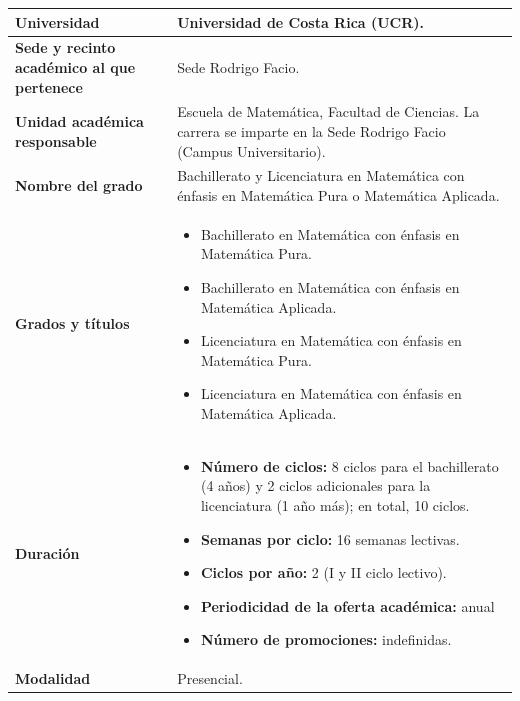 \documentclass[11pt,a4paper]{article}
\begin{document}
\begingroup
\renewcommand{\arraystretch}{1.35}
\begin{longtable}{|>{\columncolor{Celeste-UCR!15}\raggedright\arraybackslash\bfseries}p{4.3cm}|>{\raggedright\arraybackslash}p{12.5cm}|}
\hline
Universidad & Universidad de Costa Rica (UCR). \\ \hline
Sede y recinto académico al que pertenece & Sede Rodrigo Facio. \\ \hline
Unidad académica responsable & Escuela de Matemática, Facultad de Ciencias. La carrera se imparte en la Sede Rodrigo Facio (Campus Universitario). \\ \hline
Nombre del grado & Bachillerato y Licenciatura en Matemática con énfasis en Matemática Pura o Matemática Aplicada. \\ \hline
Grados y títulos &
\begin{minipage}[t]{12.2cm}
\begin{itemize}[leftmargin=1.2em, itemsep=1pt, topsep=2pt, parsep=0pt]
  \item Bachillerato en Matemática con énfasis en Matemática Pura.
  \item Bachillerato en Matemática con énfasis en Matemática Aplicada.
  \item Licenciatura en Matemática con énfasis en Matemática Pura.
  \item Licenciatura en Matemática con énfasis en Matemática Aplicada.
\end{itemize}
\end{minipage} \\ \hline
Duración &
\begin{minipage}[t]{12.2cm}
\begin{itemize}[leftmargin=1.2em, itemsep=1pt, topsep=2pt, parsep=0pt]
  \item \textbf{Número de ciclos:} 8 ciclos para el bachillerato (4 años) y 2 ciclos adicionales para la licenciatura (1 año más); en total, 10 ciclos.
  \item \textbf{Semanas por ciclo:} 16 semanas lectivas.
  \item \textbf{Ciclos por año:} 2 (I y II ciclo lectivo).
  \item \textbf{Periodicidad de la oferta académica:} anual
  \item \textbf{Número de promociones:} indefinidas.
\end{itemize}
\end{minipage} \\ \hline
Modalidad & Presencial.\\ \hline

\end{longtable}
\end{document}
